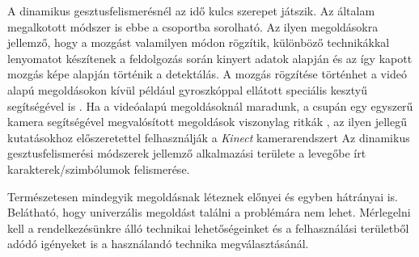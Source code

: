 A dinamikus gesztusfelismerésnél az idő kulcs szerepet játszik. Az általam megalkotott módszer is ebbe a csoportba sorolható. Az ilyen megoldásokra jellemző, hogy a mozgást valamilyen módon rögzítik, különböző technikákkal lenyomatot készítenek a feldolgozás során kinyert adatok alapján és az így kapott mozgás képe alapján történik a detektálás. A mozgás rögzítése történhet a videó alapú megoldásokon kívül például gyroszkóppal ellátott speciális kesztyű segítségével is \cite{ponraj2012wireless}. Ha a videóalapú megoldásoknál maradunk, a csupán egy egyszerű kamera segítségével megvalósított megoldások viszonylag ritkák \cite{joseph2018visual}, az ilyen jellegű kutatásokhoz előszeretettel felhasználják a \textit{Kinect} kamerarendszert \cite{zhang2013new} \cite{tang2018structured}
Az dinamikus gesztusfelismerési módszerek jellemző alkalmazási területe a levegőbe írt karakterek/szimbólumok felismerése.

Természetesen mindegyik megoldásnak léteznek előnyei és egyben hátrányai is. Belátható, hogy univerzális megoldást találni a problémára nem lehet. Mérlegelni kell a rendelkezésünkre álló technikai lehetőségeinket és a felhasználási területből adódó igényeket is a használandó technika megválasztásánál.
